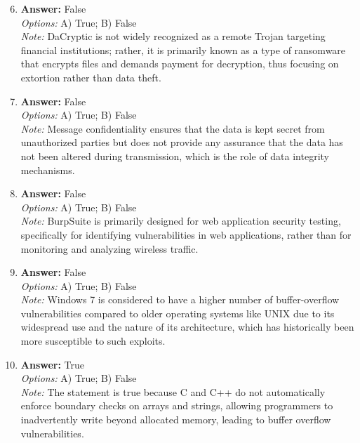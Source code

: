 \documentclass[12pt]{article}
\begin{document}
\begin{enumerate}[label=\arabic*.]
\setcounter{enumi}{5}
\item \textbf{Answer:} False
\\ \textit{Options:} A) True; B) False
\\ \textit{Note:} DaCryptic is not widely recognized as a remote Trojan targeting financial institutions; rather, it is primarily known as a type of ransomware that encrypts files and demands payment for decryption, thus focusing on extortion rather than data theft.
\item \textbf{Answer:} False
\\ \textit{Options:} A) True; B) False
\\ \textit{Note:} Message confidentiality ensures that the data is kept secret from unauthorized parties but does not provide any assurance that the data has not been altered during transmission, which is the role of data integrity mechanisms.
\item \textbf{Answer:} False
\\ \textit{Options:} A) True; B) False
\\ \textit{Note:} BurpSuite is primarily designed for web application security testing, specifically for identifying vulnerabilities in web applications, rather than for monitoring and analyzing wireless traffic.
\item \textbf{Answer:} False
\\ \textit{Options:} A) True; B) False
\\ \textit{Note:} Windows 7 is considered to have a higher number of buffer-overflow vulnerabilities compared to older operating systems like UNIX due to its widespread use and the nature of its architecture, which has historically been more susceptible to such exploits.
\item \textbf{Answer:} True
\\ \textit{Options:} A) True; B) False
\\ \textit{Note:} The statement is true because C and C++ do not automatically enforce boundary checks on arrays and strings, allowing programmers to inadvertently write beyond allocated memory, leading to buffer overflow vulnerabilities.
\end{enumerate}
\end{document}
